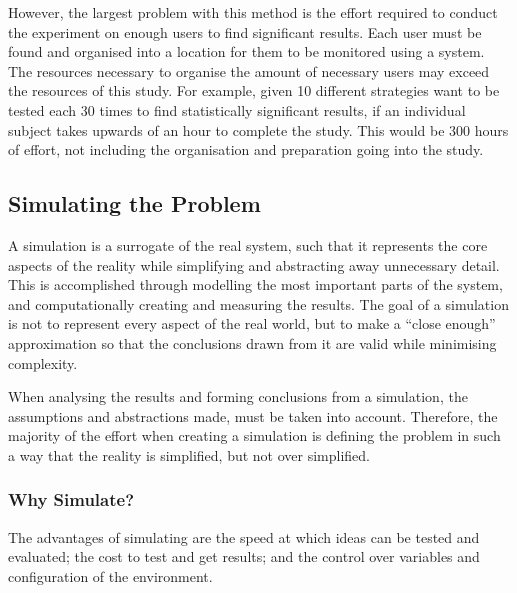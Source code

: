 However, the largest problem with this method is the effort required to conduct the experiment on enough users to find significant results.
Each user must be found and organised into a location for them to be monitored using a system.
The resources necessary to organise the amount of necessary users may exceed the resources of this study.
For example, given 10 different strategies want to be tested each 30 times to find statistically significant results, 
if an individual subject takes upwards of an hour to complete the study.
This would be 300 hours of effort, not including the organisation and preparation going into the study.

\subsection{Simulating the Problem}
A simulation is a surrogate of the real system, 
such that it represents the core aspects of the reality while simplifying and abstracting away unnecessary detail.
This is accomplished through modelling the most important parts of the system, 
and computationally creating and measuring the results. 
The goal of a simulation is not to represent every aspect of the real world, 
but to make a ``close enough'' approximation so that the conclusions drawn from it are valid while minimising complexity.

When analysing the results and forming conclusions from a simulation, 
the assumptions and abstractions made, must be taken into account. %
Therefore, the majority of the effort when creating a simulation is defining the problem in such a way that the reality is simplified, but not over simplified.

\subsubsection{Why Simulate?}
The advantages of simulating are the speed at which ideas can be tested and evaluated;
the cost to test and get results; and the control over variables and configuration of the environment.

